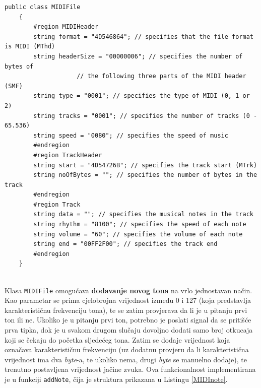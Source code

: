 \documentclass[12pt,a4paper]{article}
\begin{document}
\begin{lstlisting}[language={[Sharp]C}, caption={Klasa MIDIFile i njeni atributi}, label={MIDIclass}]
public class MIDIFile
    {
        #region MIDIHeader
        string format = "4D546864"; // specifies that the file format is MIDI (MThd)
        string headerSize = "00000006"; // specifies the number of bytes of
                    // the following three parts of the MIDI header (SMF)
        string type = "0001"; // specifies the type of MIDI (0, 1 or 2)
        string tracks = "0001"; // specifies the number of tracks (0 - 65.536)
        string speed = "0080"; // specifies the speed of music
        #endregion
        #region TrackHeader
        string start = "4D54726B"; // specifies the track start (MTrk)
        string noOfBytes = ""; // specifies the number of bytes in the track
        #endregion
        #region Track
        string data = ""; // specifies the musical notes in the track
        string rhythm = "8100"; // specifies the speed of each note
        string volume = "60"; // specifies the volume of each note
        string end = "00FF2F00"; // specifies the track end
        #endregion
    }
\end{lstlisting}
~\\
Klasa \texttt{MIDIFile} omogućava \textbf{dodavanje novog tona} na vrlo jednostavan način. Kao parametar se prima cjelobrojna vrijednost između 0 i 127 (koja predstavlja karakterističnu frekvenciju tona), te se zatim provjerava da li je u pitanju prvi ton ili ne. Ukoliko je u pitanju prvi ton, potrebno je poslati signal da se pritišće prva tipka, dok je u svakom drugom slučaju dovoljno dodati samo broj otkucaja koji se čekaju do početka sljedećeg tona. Zatim se dodaje vrijednost koja označava karakterističnu frekvenciju (uz dodatnu provjeru da li karakteristična vrijednost ima dva \textit{byte}-a, te ukoliko nema, drugi \textit{byte} se manuelno dodaje), te trenutno postavljena vrijednost jačine zvuka. Ova funkcionalnost implementirana je u funkciji \texttt{addNote}, čija je struktura prikazana u Listingu \ref{MIDInote}.
\end{document}
